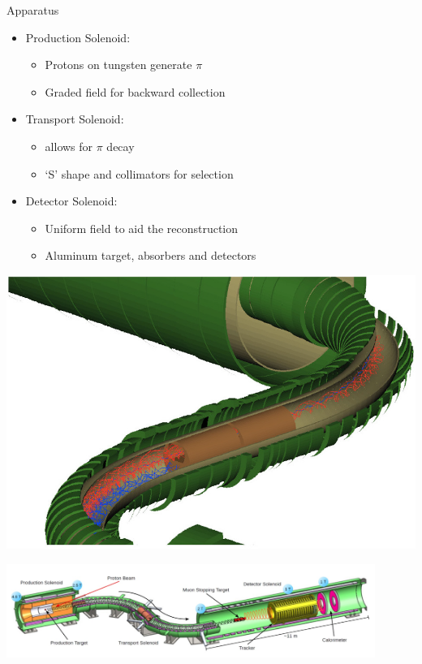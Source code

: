 \documentclass[10pt]{beamer}
\begin{document}
%
\begin{frame}{Apparatus}
\begin{minipage}{.6\textwidth}
\begin{itemize}
\setlength\itemsep{0.2cm}
\item Production Solenoid:
\begin{itemize}
\setlength\itemsep{0.1cm}
\item Protons on tungsten generate $\pi$
\item Graded field for backward collection
\end{itemize}
\item Transport Solenoid:
\begin{itemize}
\setlength\itemsep{0.1cm}
\item allows for $\pi$ decay
\item `S' shape and collimators for selection
\end{itemize}
\item Detector Solenoid:
\begin{itemize}
\setlength\itemsep{0.1cm}
\item Uniform field to aid the reconstruction
\item Aluminum target, absorbers and detectors
\end{itemize}
\end{itemize}
\end{minipage}
\begin{minipage}{0.39\textwidth}
    \centering
    \includegraphics[width=1\textwidth]{MuonBeamline_TS_window_2}
\end{minipage}

\centering
\includegraphics[width=0.9\textwidth]{mu2e_apparatus}
\end{frame}
\end{document}
